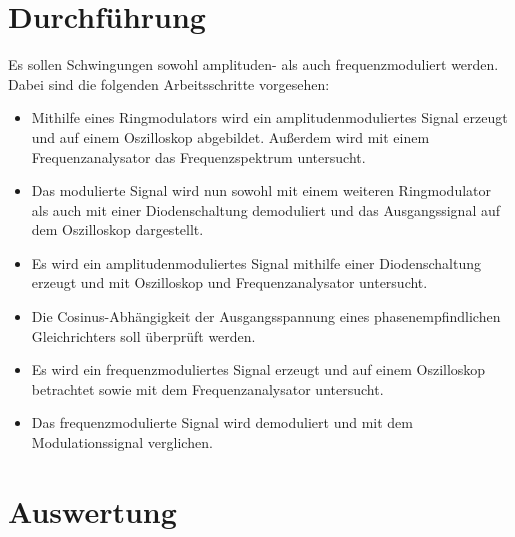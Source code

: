 \documentclass[]{scrartcl}
\begin{document}
\section{Durchführung}
Es sollen Schwingungen sowohl amplituden- als auch frequenzmoduliert werden. Dabei sind die folgenden Arbeitsschritte vorgesehen:\\
\begin{itemize}
	\item Mithilfe eines Ringmodulators wird ein amplitudenmoduliertes Signal erzeugt und auf einem Oszilloskop abgebildet. Außerdem wird mit einem Frequenzanalysator das Frequenzspektrum untersucht. \\
	\item Das modulierte Signal wird nun sowohl mit einem weiteren Ringmodulator als auch mit einer Diodenschaltung demoduliert und das Ausgangssignal auf dem Oszilloskop dargestellt. \\
	\item Es wird ein amplitudenmoduliertes Signal mithilfe einer Diodenschaltung erzeugt und mit Oszilloskop und Frequenzanalysator untersucht. \\
	\item Die Cosinus-Abhängigkeit der Ausgangsspannung eines phasenempfindlichen Gleichrichters soll überprüft werden. \\
	\item Es wird ein frequenzmoduliertes Signal erzeugt und auf einem Oszilloskop betrachtet sowie mit dem Frequenzanalysator untersucht. \\
	\item Das frequenzmodulierte Signal wird demoduliert und mit dem Modulationssignal verglichen.
\end{itemize}

\section{Auswertung}
\end{document}
